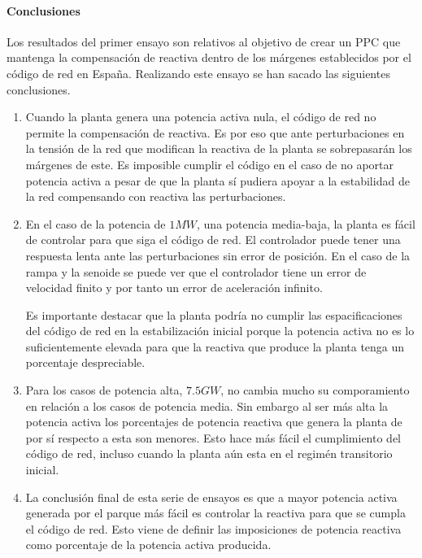 \documentclass{book}
\begin{document}
	\paragraph{Conclusiones}
Los resultados del primer ensayo son relativos al objetivo de crear un PPC que mantenga la compensaci\'on de reactiva dentro de los m\'argenes establecidos por el c\'odigo de red en España. Realizando este ensayo se han sacado las siguientes conclusiones. \par
\begin{enumerate}[1.]

\item Cuando la planta genera una potencia activa nula, el c\'odigo de red no permite la compensaci\'on de reactiva. Es por eso que ante perturbaciones en la tensi\'on de la red que modifican la reactiva de la planta se sobrepasar\'an los m\'argenes de este. Es imposible cumplir el c\'odigo en el caso de no aportar potencia activa a pesar de que la planta s\'i pudiera apoyar a la estabilidad de la red compensando con reactiva las perturbaciones. \par

\item En el caso de la potencia de $1MW$, una potencia media-baja, la planta es f\'acil de controlar para que siga el c\'odigo de red. El controlador puede tener una respuesta lenta ante las perturbaciones sin error de posici\'on. En el caso de la rampa y la senoide se puede ver que el controlador tiene un error de velocidad finito y por tanto un error de aceleraci\'on infinito. \par

Es importante destacar que la planta podr\'ia no cumplir las espacificaciones del c\'odigo de red en la estabilizaci\'on inicial porque la potencia activa no es lo suficientemente elevada para que la reactiva que produce la planta tenga un porcentaje despreciable. \par

\item Para los casos de potencia alta, $7.5 GW$, no cambia mucho su comporamiento en relaci\'on a los casos de potencia media. Sin embargo al ser m\'as alta la potencia activa los porcentajes de potencia reactiva que genera la planta de por s\'i respecto a esta son menores. Esto hace m\'as f\'acil el cumplimiento del c\'odigo de red, incluso cuando la planta a\'un esta en el regim\'en transitorio inicial. \par

\item La conclusi\'on final de esta serie de ensayos es que a mayor potencia activa generada por el parque m\'as f\'acil es controlar la reactiva para que se cumpla el c\'odigo de red. Esto viene de definir las imposiciones de potencia reactiva como porcentaje de la potencia activa producida. \par


\end{enumerate}
\end{document}
